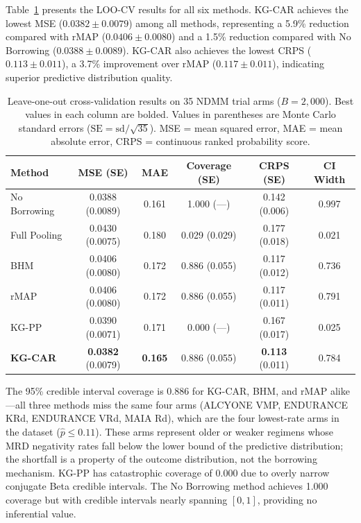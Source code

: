 \documentclass[12pt]{article}
\begin{document}
Table~\ref{tab:loocv} presents the LOO-CV results for all six methods. KG-CAR achieves the lowest MSE ($0.0382 \pm 0.0079$) among all methods, representing a 5.9\% reduction compared with rMAP ($0.0406 \pm 0.0080$) and a 1.5\% reduction compared with No Borrowing ($0.0388 \pm 0.0089$). KG-CAR also achieves the lowest CRPS ($0.113 \pm 0.011$), a 3.7\% improvement over rMAP ($0.117 \pm 0.011$), indicating superior predictive distribution quality.

\begin{table}[ht]
\centering
\caption{Leave-one-out cross-validation results on 35 NDMM trial arms ($B = 2{,}000$). Best values in each column are bolded. Values in parentheses are Monte Carlo standard errors ($\text{SE} = \text{sd}/\sqrt{35}$). MSE = mean squared error, MAE = mean absolute error, CRPS = continuous ranked probability score.}
\label{tab:loocv}
\begin{tabular}{lccccc}
\toprule
Method & MSE (SE) & MAE & Coverage (SE) & CRPS (SE) & CI Width \\
\midrule
No Borrowing & 0.0388 (0.0089) & 0.161 & 1.000 (---) & 0.142 (0.006) & 0.997 \\
Full Pooling & 0.0430 (0.0075) & 0.180 & 0.029 (0.029) & 0.177 (0.018) & 0.021 \\
BHM & 0.0406 (0.0080) & 0.172 & 0.886 (0.055) & 0.117 (0.012) & 0.736 \\
rMAP & 0.0406 (0.0080) & 0.172 & 0.886 (0.055) & 0.117 (0.011) & 0.791 \\
KG-PP & 0.0390 (0.0071) & 0.171 & 0.000 (---) & 0.167 (0.017) & 0.025 \\
\textbf{KG-CAR} & \textbf{0.0382} (0.0079) & \textbf{0.165} & 0.886 (0.055) & \textbf{0.113} (0.011) & 0.784 \\
\bottomrule
\end{tabular}
\end{table}

The 95\% credible interval coverage is 0.886 for KG-CAR, BHM, and rMAP alike---all three methods miss the same four arms (ALCYONE VMP, ENDURANCE KRd, ENDURANCE VRd, MAIA Rd), which are the four lowest-rate arms in the dataset ($\hat{p} \leq 0.11$). These arms represent older or weaker regimens whose MRD negativity rates fall below the lower bound of the predictive distribution; the shortfall is a property of the outcome distribution, not the borrowing mechanism. KG-PP has catastrophic coverage of 0.000 due to overly narrow conjugate Beta credible intervals. The No Borrowing method achieves 1.000 coverage but with credible intervals nearly spanning $[0, 1]$, providing no inferential value.
\end{document}
